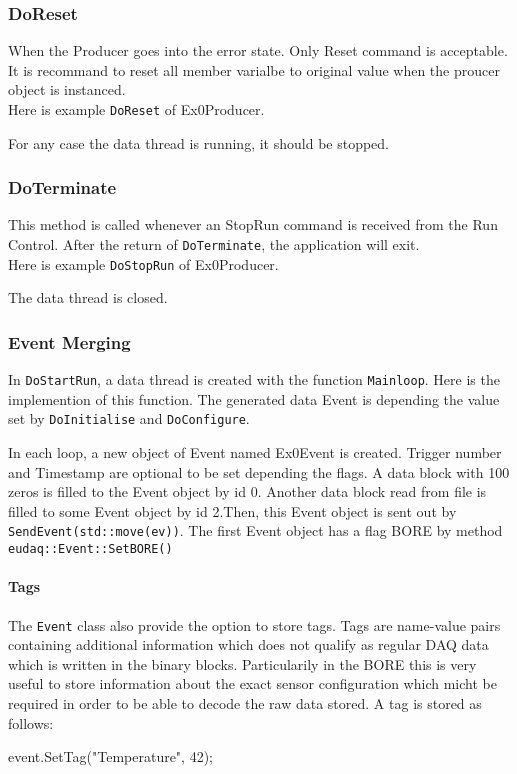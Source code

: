 \subsubsection{DoReset}
When the Producer goes into the error state. Only Reset command is acceptable. It is recommand to reset all member varialbe to original value when the proucer object is instanced.\\
Here is example \lstinline[style=cpp]{DoReset} of Ex0Producer. 

For any case the data thread is running, it should be stopped.

\subsubsection{DoTerminate}
This method is called whenever an StopRun command is received from the Run Control. After the return of \lstinline[style=cpp]{DoTerminate}, the application will exit.\\
Here is example \lstinline[style=cpp]{DoStopRun} of Ex0Producer.

The data thread is closed. 

\subsubsection{Event Merging}
In \lstinline[style=cpp]{DoStartRun}, a data thread is created with the function \lstinline[style=cpp]{Mainloop}. Here is the implemention of this function. The generated data Event is depending the value set by \lstinline[style=cpp]{DoInitialise} and \lstinline[style=cpp]{DoConfigure}.

In each loop, a new object of Event named Ex0Event is created. Trigger number and Timestamp are optional to be set depending the flags. A data block with 100 zeros is filled to the Event object by id 0. Another data block read from file is filled to some Event object by id 2.Then, this Event object is sent out by \lstinline[style=cpp]{SendEvent(std::move(ev))}. The first Event object has a flag BORE by method \lstinline[style=cpp]{eudaq::Event::SetBORE()}

\paragraph{Tags}\label{sec:Tags}
The \texttt{Event} class also provide the option to store tags.
Tags are name-value pairs containing additional information which does not qualify as regular DAQ data which is written in the binary blocks.
Particularily in the \gls{BORE} this is very useful to store information about the exact sensor configuration which micht be required in order to be able to decode the raw data stored.
A tag is stored as follows:
\begin{listing}
event.SetTag("Temperature", 42);
\end{listing}

